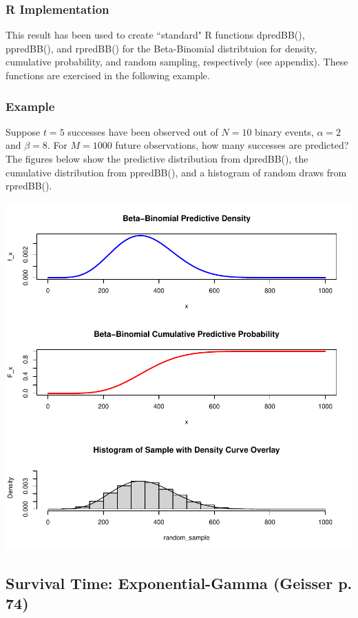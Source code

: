 \documentclass[12pt, a4paper]{article}
\begin{document}
\clearpage

    \subsubsection{R Implementation}

This result has been used to create ``standard" R functions dpredBB(), ppredBB(), and rpredBB() for the Beta-Binomial distribtuion for density, cumulative probability, and random sampling, respectively (see appendix).  These functions are exercised in the following example.


    \subsubsection{Example}

Suppose $t=5$ successes have been observed out of $N=10$ binary events, $\alpha = 2$ and $\beta = 8$.  For $M = 1000$ future observations, how many successes are predicted?  The figures below show the predictive distribution from dpredBB(), the cumulative distribution from ppredBB(), and a histogram of random draws from rpredBB().


\includegraphics{Thesis-003}



    \subsection{Survival Time:  Exponential-Gamma (Geisser p. 74)}
\end{document}
